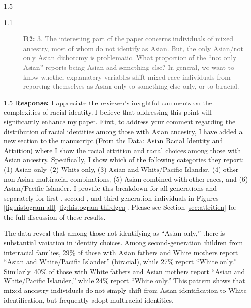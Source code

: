 \documentclass[12pt,english]{article}
\newcommand{\rrquote}{1.1}
\newcommand{\rrxspc}{1.5}
\begin{document}
\begin{refsection}
\begin{spacing}{\rrxspc}
        \end{spacing}

    \begin{spacing}{\rrquote}
        \begin{quotation}
        \textbf{R2: } 3. The interesting part of the paper concerns individuals of mixed ancestry, most of whom do not identify as Asian. But, the only Asian/not only Asian dichotomy is problematic. What proportion of the “not only Asian” reports being Asian and something else? In general, we want to know whether explanatory variables shift mixed-race individuals from reporting themselves as Asian only to something else only, or to biracial.
        \end{quotation}
        \end{spacing}
        
        \begin{spacing}{\rrxspc}
            \textbf{Response:} I appreciate the reviewer's insightful comments on the complexities of racial identity. I believe that addressing this point will significantly enhance my paper. First, to address your comment regarding the distribution of racial identities among those with Asian ancestry, I have added a new section to the manuscript (From the Data: Asian Racial Identity and Attrition) where I show the racial attrition and racial choices among those with Asian ancestry. Specifically, I show which of the following categories they report: (1) Asian only, (2) White only, (3) Asian and White/Pacific Islander, (4) other non-Asian multiracial combinations, (5) Asian combined with other races, and (6) Asian/Pacific Islander. I provide this breakdown for all generations and separately for first-, second-, and third-generation individuals in Figures \ref{fig:histogram-all}-\ref{fig:histogram-thirdgen}. Please see Section \ref{sec:attrition} for the full discussion of these results. 

            The data reveal that among those not identifying as ``Asian only,'' there is substantial variation in identity choices. Among second-generation children from interracial families, 29\% of those with Asian fathers and White mothers report ``Asian and White/Pacific Islander'' (biracial), while 27\% report ``White only.'' Similarly, 40\% of those with White fathers and Asian mothers report ``Asian and White/Pacific Islander,'' while 24\% report ``White only.'' This pattern shows that mixed-ancestry individuals do not simply shift from Asian identification to White identification, but frequently adopt multiracial identities.


\end{spacing}
\end{refsection}
\end{document}
